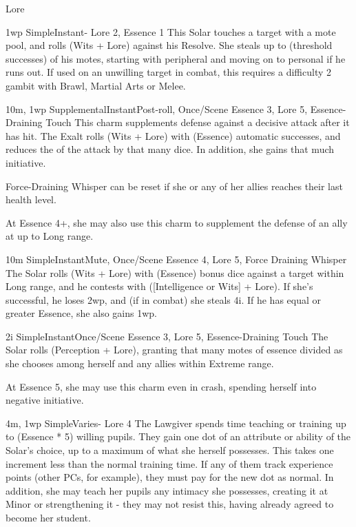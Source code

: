 \begin{Ability}{Lore}

  {1wp}
  {Simple}{Instant}{-}
  {Lore 2, Essence 1}
  This Solar touches a target with a mote pool, and rolls (Wits + Lore) against his Resolve. She steals up to (threshold successes) of his motes, starting with peripheral and moving on to personal if he runs out. If used on an unwilling target in combat, this requires a difficulty 2 gambit with Brawl, Martial Arts or Melee.

  {10m, 1wp}
  {Supplemental}{Instant}{Post-roll, Once/Scene}
  {Essence 3, Lore 5, Essence-Draining Touch}
  This charm supplements defense against a decisive attack after it has hit. The Exalt rolls (Wits + Lore) with (Essence) automatic successes, and reduces the of the attack by that many dice. In addition, she gains that much initiative.

  Force-Draining Whisper can be reset if she or any of her allies reaches their last health level.

  At Essence 4+, she may also use this charm to supplement the defense of an ally at up to Long range.

  {10m}
  {Simple}{Instant}{Mute, Once/Scene}
  {Essence 4, Lore 5, Force Draining Whisper}
  The Solar rolls (Wits + Lore) with (Essence) bonus dice against a target within Long range, and he contests with ([Intelligence or Wits] + Lore). If she's successful, he loses 2wp, and (if in combat) she steals 4i. If he has equal or greater Essence, she also gains 1wp.

  {2i}
  {Simple}{Instant}{Once/Scene}
  {Essence 3, Lore 5, Essence-Draining Touch}
  The Solar rolls (Perception + Lore), granting that many motes of essence divided as she chooses among herself and any allies within Extreme range.

  At Essence 5, she may use this charm even in crash, spending herself into negative initiative.

  {4m, 1wp}
  {Simple}{Varies}{-}
  {Lore 4}
  The Lawgiver spends time teaching or training up to (Essence * 5) willing pupils. They gain one dot of an attribute or ability of the Solar's choice, up to a maximum of what she herself possesses. This takes one increment less than the normal training time. If any of them track experience points (other PCs, for example), they must pay for the new dot as normal. In addition, she may teach her pupils any intimacy she possesses, creating it at Minor or strengthening it - they may not resist this, having already agreed to become her student.


\end{Ability}
